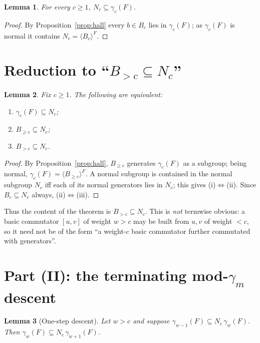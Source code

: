 \documentclass{amsart}
\newtheorem{lemma}{Lemma}
\theoremstyle{definition}
\theoremstyle{remark}
\begin{document}
\begin{lemma}\label{lem:easy}
For every $c\ge1$, $N_c\subseteq\gamma_c(F)$.
\end{lemma}

\begin{proof}
By Proposition~\ref{prop:hall} every $b\in B_c$ lies in $\gamma_c(F)$; as
$\gamma_c(F)$ is normal it contains $N_c=\langle B_c\rangle^{F}$.
\end{proof}

\section{Reduction to ``$B_{>c}\subseteq N_c$''}\label{sec:reduce0}

\begin{lemma}\label{lem:reduce-to-Bw}
Fix $c\ge1$. The following are equivalent:
\begin{enumerate}
\item[(i)] $\gamma_c(F)\subseteq N_c$;
\item[(ii)] $B_{\ge c}\subseteq N_c$;
\item[(iii)] $B_{>c}\subseteq N_c$.
\end{enumerate}
\end{lemma}

\begin{proof}
By Proposition~\ref{prop:hall}, $B_{\ge c}$ generates $\gamma_c(F)$ as a subgroup;
being normal, $\gamma_c(F)=\langle B_{\ge c}\rangle^{F}$. A normal subgroup is
contained in the normal subgroup $N_c$ iff each of its normal generators lies in
$N_c$; this gives (i)$\Leftrightarrow$(ii). Since $B_c\subseteq N_c$ always,
(ii)$\Leftrightarrow$(iii).
\end{proof}

\noindent
Thus the content of the theorem is $B_{>c}\subseteq N_c$. This is \emph{not}
termwise obvious: a basic commutator $[u,v]$ of weight $w>c$ may be built from
$u,v$ of weight $<c$, so it need not be of the form ``a weight-$c$ basic commutator
further commutated with generators''.

\section{Part (II): the terminating mod-$\gamma_m$ descent}\label{sec:moddescent}

\begin{lemma}[One-step descent]\label{lem:onestep}
Let $w>c$ and suppose $\gamma_{w-1}(F)\subseteq N_c\,\gamma_{w}(F)$. Then
$\gamma_{w}(F)\subseteq N_c\,\gamma_{w+1}(F)$.
\end{lemma}
\end{document}
